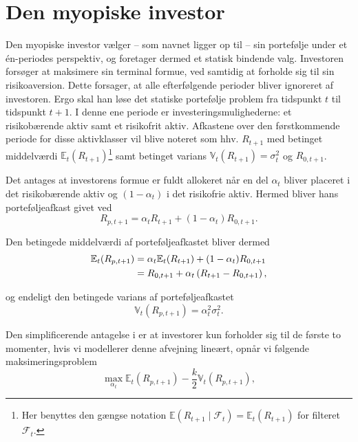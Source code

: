 \documentclass[
  a4paper,
  oneside]{memoir}
\begin{document}
\hypertarget{myoinv}{%
\section{Den myopiske investor}\label{myoinv}}

Den myopiske investor vælger -- som navnet ligger op til -- sin portefølje under et én-periodes perspektiv, og foretager dermed et statisk bindende valg. Investoren forsøger at maksimere sin terminal formue, ved samtidig at forholde sig til sin risikoaversion. Dette forsager, at alle efterfølgende perioder bliver ignoreret af investoren. Ergo skal han løse det statiske portefølje problem fra tidspunkt \(t\) til tidspunkt \(t+1\). I denne ene periode er investeringsmulighederne: et risikobærende aktiv samt et risikofrit aktiv. Afkastene over den førstkommende periode for disse aktivklasser vil blive noteret som hhv. \(R_{t+1}\) med betinget middelværdi \(\mathbb{E}_t(R_{t+1})\)\footnote{Her benyttes den gængse notation \(\mathbb{E}(R_{t+1}\mid \mathcal{F}_t)=\mathbb{E}_t(R_{t+1})\) for filteret \(\mathcal{F}_t\).} samt betinget varians \(\mathbb{V}_t(R_{t+1})=\sigma_t^2\) og \(R_{0,t+1}\).

Det antages at investorens formue er fuldt allokeret når en del \(\alpha_t\) bliver placeret i det risikobærende aktiv og \((1-\alpha_t)\) i det risikofrie aktiv. Hermed bliver hans porteføljeafkast givet ved
\begin{equation}
R_{p,t+1}=\alpha_t R_{t+1}+\left(1-\alpha_t\right)R_{0,t+1}.\label{eq:Portafk}
\end{equation}

Den betingede middelværdi af porteføljeafkastet bliver dermed
\begin{align}
\mathbb{E}_t(R_{p,t+1})&=\alpha_t\mathbb{E}_t(R_{t+1})+(1-\alpha_t)R_{0,t+1} \notag\\ 
&=R_{0,t+1}+ \alpha_t\left(R_{t+1} - R_{0,t+1}\right),\label{eq:Forvport}
\end{align}

og endeligt den betingede varians af porteføljeafkastet
\begin{equation}
\mathbb{V}_t(R_{p,t+1})=\alpha_t^2\sigma_t^2.\label{eq:Varport}
\end{equation}

Den simplificerende antagelse i \citep{Markowitz1952} er at investorer kun forholder sig til de første to momenter, hvis vi modellerer denne afvejning lineært, opnår vi følgende maksimeringsproblem
\begin{equation}
\max_{\alpha_t} \mathbb{E}_t\left(R_{p,t+1}\right) -\frac{k}{2} \mathbb{V}_t\left(R_{p,t+1}\right),\label{eq:Statmaks}
\end{equation}
\end{document}
